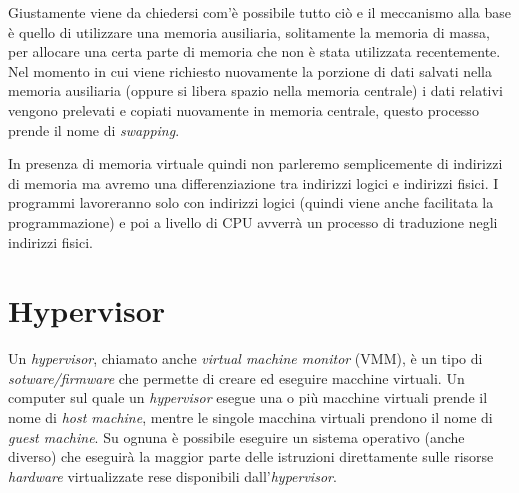Giustamente viene da chiedersi com'è possibile tutto ciò e il meccanismo alla base è quello di utilizzare una memoria ausiliaria, solitamente la memoria di massa, per allocare una certa parte di memoria che non è stata utilizzata recentemente. Nel momento in cui viene richiesto nuovamente la porzione di dati salvati nella memoria ausiliaria (oppure si libera spazio nella memoria centrale) i dati relativi vengono prelevati e copiati nuovamente in memoria centrale, questo processo prende il nome di \textit{swapping}. 

In presenza di memoria virtuale quindi non parleremo semplicemente di indirizzi di memoria ma avremo una differenziazione tra indirizzi logici e indirizzi fisici. I programmi lavoreranno solo con indirizzi logici (quindi viene anche facilitata la programmazione) e poi a livello di CPU avverrà un processo di traduzione negli indirizzi fisici.

\section{Hypervisor}
Un \textit{hypervisor}, chiamato anche \textit{virtual machine monitor} (VMM), è un tipo di \textit{sotware/firmware} che permette di creare ed eseguire macchine virtuali. Un computer sul quale un \textit{hypervisor} esegue una o più macchine virtuali prende il nome di \textit{host machine}, mentre le singole macchina virtuali prendono il nome di \textit{guest machine}. Su ognuna è possibile eseguire un sistema operativo (anche diverso) che eseguirà la maggior parte delle istruzioni direttamente sulle risorse \textit{hardware} virtualizzate rese disponibili dall'\textit{hypervisor}.